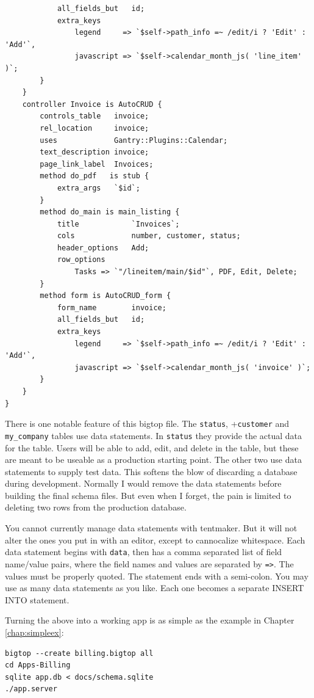\begin{verbatim}
            all_fields_but   id;
            extra_keys
                legend     => `$self->path_info =~ /edit/i ? 'Edit' : 'Add'`,
                javascript => `$self->calendar_month_js( 'line_item' )`;
        }
    }
    controller Invoice is AutoCRUD {
        controls_table   invoice;
        rel_location     invoice;
        uses             Gantry::Plugins::Calendar;
        text_description invoice;
        page_link_label  Invoices;
        method do_pdf   is stub {
            extra_args   `$id`;
        }
        method do_main is main_listing {
            title            `Invoices`;
            cols             number, customer, status;
            header_options   Add;
            row_options
                Tasks => `"/lineitem/main/$id"`, PDF, Edit, Delete;
        }
        method form is AutoCRUD_form {
            form_name        invoice;
            all_fields_but   id;
            extra_keys
                legend     => `$self->path_info =~ /edit/i ? 'Edit' : 'Add'`,
                javascript => `$self->calendar_month_js( 'invoice' )`;
        }
    }
}
\end{verbatim}

There is one notable feature of this bigtop file. The \verb+status+,
+\verb+customer+ and \verb+my_company+ tables use data statements.  In
\verb+status+ they provide the actual data for the table.  Users will be
able to add, edit, and delete in the table, but these are meant to be
useable as a production starting point.  The other two use data statements
to supply test data.  This softens the blow of discarding a database during
development.  Normally I would remove the data statements before building
the final schema files.  But even when I forget, the pain is limited to
deleting two rows from the production database.

You cannot currently manage data statements with tentmaker.  But it will
not alter the ones you put in with an editor, except to cannocalize whitespace.
Each data statement begins with \verb+data+, then has a comma separated
list of field name/value pairs, where the field names and values are separated
by \verb+=>+.  The values must be properly quoted.  The statement ends with
a semi-colon.  You may use as many data statements as you like.
Each one becomes a separate INSERT INTO statement.

Turning the above into a working app is as simple as the example in Chapter
\ref{chap:simpleex}:

\begin{verbatim}
bigtop --create billing.bigtop all
cd Apps-Billing
sqlite app.db < docs/schema.sqlite
./app.server
\end{verbatim}

